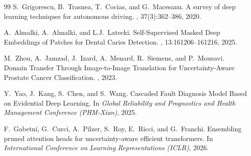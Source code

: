 \documentclass[11pt, a4paper]{article}
\begin{document}
\begin{thebibliography}{99}
S.~Grigorescu, B.~Trasnea, T.~Cocias, and G.~Macesanu.
\newblock A survey of deep learning techniques for autonomous driving.
, 37(3):362--386, 2020.

A.~Almalki, A.~Almalki, and L.J.~Latecki.
\newblock Self-Supervised Masked Deep Embeddings of Patches for Dental Caries Detection.
, 13:161206--161216, 2025.

M.~Zhou, A.~Jamzad, J.~Izard, A.~Menard, R.~Siemens, and P.~Mousavi.
\newblock Domain Transfer Through Image-to-Image Translation for Uncertainty-Aware Prostate Cancer Classification.
, 2023.

Y.~Yao, J.~Kang, S.~Chen, and S.~Wang.
\newblock Cascaded Fault Diagnosis Model Based on Evidential Deep Learning.
\newblock In {\em Global Reliability and Prognostics and Health Management Conference (PHM-Xian)}, 2025.

F.~Gabetni, G.~Curci, A.~Pilzer, S.~Roy, E.~Ricci, and G.~Franchi.
\newblock Ensembling pruned attention heads for uncertainty-aware efficient transformers.
\newblock In {\em International Conference on Learning Representations (ICLR)}, 2026.

\end{thebibliography}
\end{document}
